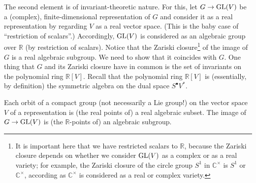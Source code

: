 The second element is of invariant-theoretic nature. For this, let $G\to {\rm GL}(V)$ be a (complex), finite-dimensional representation of $G$ and consider it as a real representation by regarding $V$ as a real vector space. (This is the baby case of ``restriction of scalars''.) Accordingly, ${\rm GL}(V)$ is considered as an algebraic group over $\mathbb R$ (by restriction of scalars). Notice that the Zariski closure\footnote{It is important here that we have restricted scalars to $\mathbb R$, because the Zariski closure depends on whether we consider ${\rm GL}(V)$ as a complex or as a real variety; for example, the Zariski closure of the circle group $S^1$ in $\mathbb C^\times$ is $S^1$ or $\mathbb C^\times$, according as $\mathbb C^\times$ is considered as a real or complex variety.} of the image of $G$ is a real algebraic subgroup. We need to show that it coincides with $G$. One thing that $G$ and its Zariski closure have in common is the set of invariants on the polynomial ring $\mathbb R[V]$. Recall that the polynomial ring $\mathbb R[V]$ is (essentially, by 
definition) the symmetric algebra on the dual space $S^\bullet V^*$.

\begin{proposition}
Each orbit of a compact group (not necessarily a Lie group!) on the vector space $V$ of a representation is (the real points of) a real algebraic subset. The image of $G\to {\rm GL}(V)$ is (the $\mathbb R$-points of) an algebraic subgroup.
\end{proposition}

